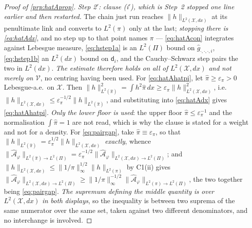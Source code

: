 \begin{proof}[Proof of \cref{prp:hatAprop}]
\emph{Step 2$'$: clause (i$'$), which is Step~2 stopped one line earlier and then restarted.} The chain
just run reaches $\|h\|_{L^{2}(\mathcal X,dx)}$ at its penultimate link and converts to $L^{2}(\pi)$ only
at the last; \emph{stopping there is \eqref{eq:hatAdx}}, and no step up to that point names $\pi$ ---
\eqref{eq:hatAcon} integrates against Lebesgue measure, \eqref{eq:hstep1a} is an $L^{2}(\Pi)$ bound on
$\hat g_{\cdot,\cdot,\cdot,i}$, \eqref{eq:hstep1b} an $L^{2}(dx)$ bound on $\mathsf d_i$, and the
Cauchy--Schwarz step pairs the two in $L^{2}(dx)$. \emph{The estimate therefore holds on all of
$L^{2}(\mathcal X,dx)$ and not merely on $\mathcal V$}, no centring having been used.
For \eqref{eq:hatAhatpi}, let $\hat\pi\ge\varepsilon_\pi>0$ Lebesgue-a.e.\ on $\mathcal X$. Then
$\|h\|^{2}_{L^{2}(\hat\pi)}=\int h^{2}\hat\pi\,dx\ge\varepsilon_\pi\|h\|^{2}_{L^{2}(\mathcal X,dx)}$,
i.e.\ $\|h\|_{L^{2}(\mathcal X,dx)}\le\varepsilon_\pi^{-1/2}\|h\|_{L^{2}(\hat\pi)}$, and substituting into
\eqref{eq:hatAdx} gives \eqref{eq:hatAhatpi}. \emph{Only the lower floor is used}: the upper floor
$\hat\pi\le\varepsilon_\pi^{-1}$ and the normalisation $\int\hat\pi=1$ are not read, which is why the
clause is stated for a weight and not for a density.
For \eqref{eq:pairgap}, take $\hat\pi\equiv\varepsilon_\pi$, so that
$\|h\|_{L^{2}(\hat\pi)}=\varepsilon_\pi^{1/2}\|h\|_{L^{2}(\mathcal X,dx)}$ \emph{exactly}, whence
$\|\hat{\mathcal A}_\varphi\|_{L^{2}(\hat\pi)\to L^{2}(\Pi)}
=\varepsilon_\pi^{-1/2}\|\hat{\mathcal A}_\varphi\|_{L^{2}(\mathcal X,dx)\to L^{2}(\Pi)}$; and
$\|h\|_{L^{2}(\mathcal X,dx)}\le\|1/\pi\|_\infty^{1/2}\|h\|_{L^{2}(\pi)}$ by C1(ii) gives
$\|\hat{\mathcal A}_\varphi\|_{L^{2}(\mathcal X,dx)\to L^{2}(\Pi)}
\ge\|1/\pi\|_\infty^{-1/2}\|\hat{\mathcal A}_\varphi\|_{L^{2}(\pi)\to L^{2}(\Pi)}$, the two together
being \eqref{eq:pairgap}. \emph{The supremum defining the middle quantity is over
$L^{2}(\mathcal X,dx)$ in both displays}, so the inequality is between two suprema of the same numerator
over the same set, taken against two different denominators, and no interchange is involved.


\end{proof}
